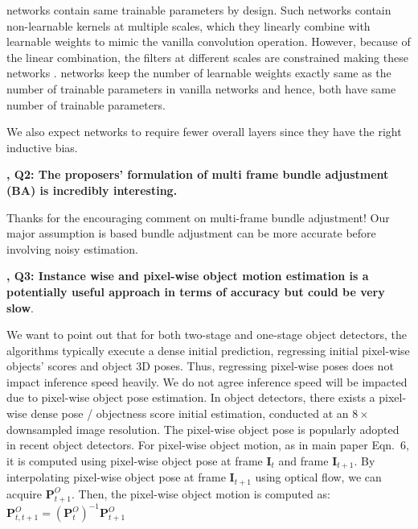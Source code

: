 \documentclass[12pt]{article}
\newcommand{\revOne}{{\color{red}{R1}}}
\begin{document}
    \ScaleEquivariant networks contain same trainable parameters \cite{sosnovik2020sesn} by design.
    Such networks contain non-learnable kernels at multiple scales, which they linearly combine with learnable weights to mimic the vanilla convolution operation. 
    However, because of the linear combination, the filters at different scales are constrained making these networks \scaleEquivariant. 
    \scaleEquivariant networks keep the number of learnable weights exactly same as the number of trainable parameters in vanilla networks and hence, both have same number of trainable parameters.
    
    We also expect \scaleEquivariant networks to require fewer overall layers since they have the right inductive bias.

    \textbf{\revOne, Q2: The proposers’ formulation of multi frame \twoD bundle adjustment (BA) is incredibly
interesting.}

    Thanks for the encouraging comment on multi-frame \twoD bundle adjustment! 
    Our major assumption is \twoD based bundle adjustment can be more accurate before involving noisy \threeD estimation.

    \textbf{\revOne, Q3: Instance wise and pixel-wise object motion estimation is a potentially useful approach in terms of accuracy but could be very slow}.

    We want to point out that for both two-stage and one-stage object detectors, the algorithms typically execute a dense initial prediction, regressing initial pixel-wise objects' scores and object 3D poses. 
    Thus, regressing pixel-wise poses does not impact inference speed heavily. 
    We do not agree inference speed will be impacted due to pixel-wise object pose estimation. 
    In object detectors, there exists a pixel-wise dense pose / objectness score initial estimation, conducted at an $8\times$ downsampled image resolution. 
    The pixel-wise object pose is popularly adopted in recent object detectors.
    For pixel-wise object motion, as in main paper Eqn.~$6$, it is computed using pixel-wise object pose at frame $\mathbf{I}_t$ and frame $\mathbf{I}_{t+1}$.
    By interpolating pixel-wise object pose at frame $\mathbf{I}_{t+1}$ using optical flow, we can acquire $\mathbf{P}_{t+1}^O$.
    Then, the pixel-wise object motion is computed as: $\mathbf{P}_{t, t+1}^O = (\mathbf{P}_{t}^O)^{-1}\mathbf{P}_{t+1}^O$
    
\end{document}
